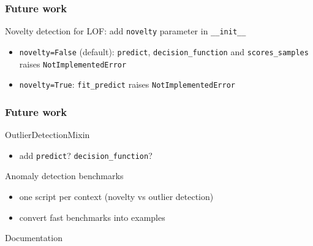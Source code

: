 \documentclass[slidetop,11pt]{beamer}
\begin{document}
\begin{frame}\frametitle{Future work}

Novelty detection for LOF: add \texttt{novelty} parameter in \texttt{__init__}
\begin{itemize}
  \item \texttt{novelty=False} (default): \texttt{predict}, \texttt{decision_function} and \texttt{scores_samples} raises \texttt{NotImplementedError}
  \item \texttt{novelty=True}: \texttt{fit_predict} raises \texttt{NotImplementedError}
\end{itemize}

\end{frame}


\begin{frame}\frametitle{Future work}

OutlierDetectionMixin
\begin{itemize}
  \item add \texttt{predict}? \texttt{decision_function}?
\end{itemize}

Anomaly detection benchmarks
\begin{itemize}
  \item one script per context (novelty vs outlier detection)
  \item convert fast benchmarks into examples
\end{itemize}

Documentation



\end{frame}
\end{document}
